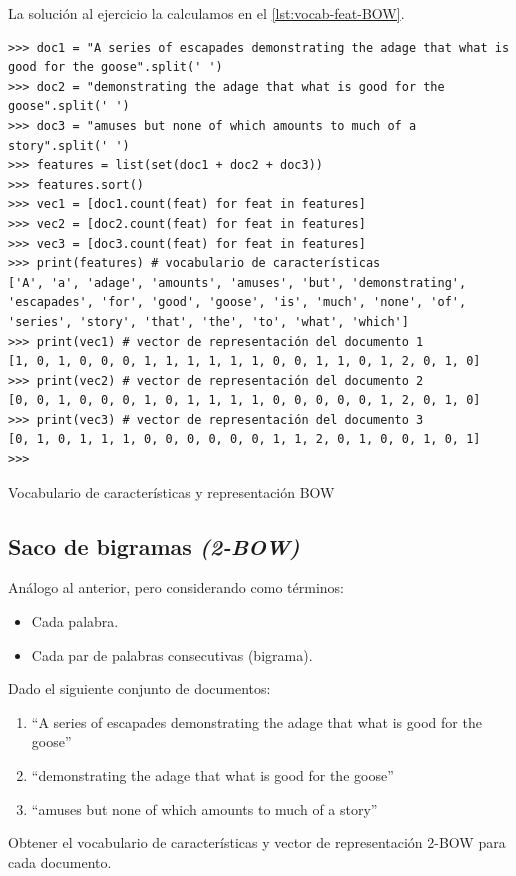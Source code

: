 La solución al ejercicio la calculamos en el \autoref{lst:vocab-feat-BOW}.

\begin{listing}[htbp]
\begin{verbatim}
>>> doc1 = "A series of escapades demonstrating the adage that what is good for the goose".split(' ')
>>> doc2 = "demonstrating the adage that what is good for the goose".split(' ')
>>> doc3 = "amuses but none of which amounts to much of a story".split(' ')
>>> features = list(set(doc1 + doc2 + doc3))
>>> features.sort()
>>> vec1 = [doc1.count(feat) for feat in features]
>>> vec2 = [doc2.count(feat) for feat in features]
>>> vec3 = [doc3.count(feat) for feat in features]
>>> print(features) # vocabulario de características
['A', 'a', 'adage', 'amounts', 'amuses', 'but', 'demonstrating', 'escapades', 'for', 'good', 'goose', 'is', 'much', 'none', 'of', 'series', 'story', 'that', 'the', 'to', 'what', 'which']
>>> print(vec1) # vector de representación del documento 1
[1, 0, 1, 0, 0, 0, 1, 1, 1, 1, 1, 1, 0, 0, 1, 1, 0, 1, 2, 0, 1, 0]
>>> print(vec2) # vector de representación del documento 2
[0, 0, 1, 0, 0, 0, 1, 0, 1, 1, 1, 1, 0, 0, 0, 0, 0, 1, 2, 0, 1, 0]
>>> print(vec3) # vector de representación del documento 3
[0, 1, 0, 1, 1, 1, 0, 0, 0, 0, 0, 0, 1, 1, 2, 0, 1, 0, 0, 1, 0, 1]
>>> 
\end{verbatim}
\caption{Vocabulario de características y representación BOW}
\label{lst:vocab-feat-BOW}
\end{listing}

\FloatBarrier
\subsection{Saco de bigramas \emph{(2-BOW)}}

Análogo al anterior, pero considerando como términos:
\begin{itemize}
\item Cada palabra.
\item Cada par de palabras consecutivas (bigrama).
\end{itemize}

\begin{example}\label{exa:ml-2bow}
Dado el siguiente conjunto de documentos:
\begin{enumerate}
\item ``A series of escapades demonstrating the adage that what is good for the goose''
\item ``demonstrating the adage that what is good for the goose''
\item ``amuses but none of which amounts to much of a story''
\end{enumerate}
Obtener el vocabulario de características y vector de representación 2-BOW para cada documento.
\end{example}

